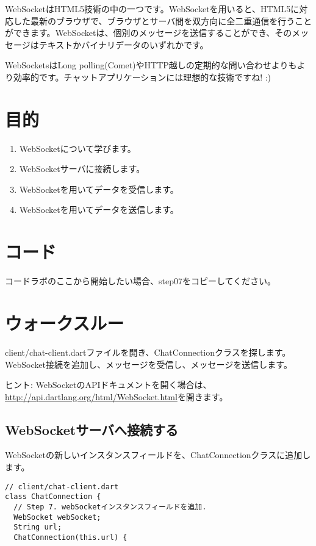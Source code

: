 
WebSocketはHTML5技術の中の一つです。WebSocketを用いると、HTML5に対応した最新のブラウザで、ブラウザとサーバ間を双方向に全二重通信を行うことができます。WebSocketは、個別のメッセージを送信することができ、そのメッセージはテキストかバイナリデータのいずれかです。

WebSocketsはLong polling(Comet)やHTTP越しの定期的な問い合わせよりもより効率的です。チャットアプリケーションには理想的な技術ですね! :)

\section{目的}

\begin{enumerate}
\item WebSocketについて学びます。
\item WebSocketサーバに接続します。
\item WebSocketを用いてデータを受信します。
\item WebSocketを用いてデータを送信します。
\end{enumerate}

\section{コード}

コードラボのここから開始したい場合、step07をコピーしてください。

\section{ウォークスルー}

client/chat-client.dartファイルを開き、ChatConnectionクラスを探します。WebSocket接続を追加し、メッセージを受信し、メッセージを送信します。

ヒント: WebSocketのAPIドキュメントを開く場合は、\url{http://api.dartlang.org/html/WebSocket.html}を開きます。

\subsection{WebSocketサーバへ接続する}

WebSocketの新しいインスタンスフィールドを、ChatConnectionクラスに追加します。

\begin{verbatim}
// client/chat-client.dart
class ChatConnection {
  // Step 7. webSocketインスタンスフィールドを追加.
  WebSocket webSocket;
  String url;
  ChatConnection(this.url) {
\end{verbatim}


